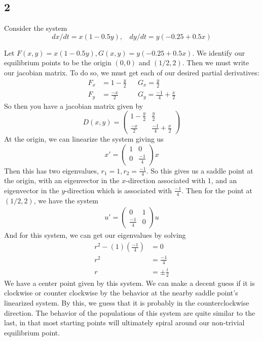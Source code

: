 \documentclass{article}
\theoremstyle{definition}
\begin{document}
    \subsection*{2}
        \begin{mdframed}
            Consider the system
            \[
                dx/dt = x(1 - 0.5y), \ \ \ \ dy/dt = y(-0.25 + 0.5x)   
            \]
        \end{mdframed}
        Let $F(x,y) = x(1 - 0.5y), G(x,y) = y(-0.25 + 0.5x)$.
        We identify our equilibrium points to be the origin $(0,0)$ and 
        $(1/2, 2)$. Then we must write our jacobian matrix.
        To do so, we must get each of our desired partial derivatives:
        \begin{align*}
            F_x &= 1 - \frac{y}{2} && G_x = \frac{y}{2} \\
            F_y &= \frac{-x}{2} && G_y = \frac{-1}{4} + \frac{x}{2}
        \end{align*}
        So then you have a jacobian matrix given by 
        \[
            D(x,y) = \begin{pmatrix}
                1 - \frac{y}{2} & \frac{y}{2} \\
                \frac{-x}{2} & \frac{-1}{4} + \frac{x}{2}
            \end{pmatrix}   
        \]
        At the origin, we can linearize the system giving us 
        \[
            x' = \begin{pmatrix}
                1 & 0 \\
                0 & \frac{-1}{4}
            \end{pmatrix}  x 
        \]
        Then this has two eigenvalues, $r_1 = 1, r_2 = \frac{-1}{4}$.
        So this gives us a saddle point at the origin, with an eigenvector in the 
        $x$-direction associated with 1, and an eigenvector in the $y$-direction 
        which is associated with $\frac{-1}{4}$.
        Then for the point at $(1/2, 2)$, we have the system
        \begin{align*}
            u' = \begin{pmatrix}0 & 1 \\
            \frac{-1}{4} & 0\end{pmatrix}u
        \end{align*}
        And for this system, we can get our eigenvalues by solving 
        \begin{align*}
            r^2 - (1)(\frac{-1}{4}) &= 0 \\
            r^2 &= \frac{-1}{4} \\
            r &= \pm \frac{i}{2}
        \end{align*}
        We have a center point given by this system. We can make 
        a decent guess if it is clockwise or counter clockwise by the behavior 
        at the nearby saddle point's linearized system. 
        By this, we guess that it is probably in the counterclockwise direction.
        The behavior of the populations of this system are quite similar to the last,
        in that most starting points will ultimately spiral around our non-trivial equilibrium point.
\end{document}
